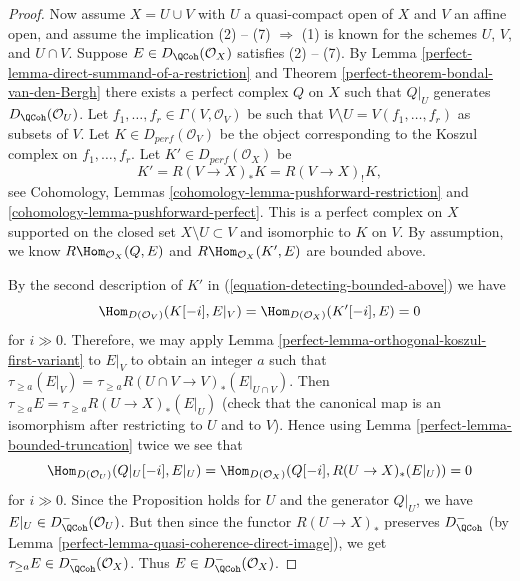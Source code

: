 \begin{proof}
\medskip\noindent
Now assume $X = U \cup V$ with $U$ a quasi-compact open of $X$ and
$V$ an affine open, and assume the implication (2) -- (7) $\Rightarrow$ (1)
is known for the schemes $U$, $V$, and $U \cap V$.
Suppose $E \in D_\QCoh(\mathcal{O}_X)$ satisfies (2) -- (7).
By Lemma \ref{perfect-lemma-direct-summand-of-a-restriction} and
Theorem \ref{perfect-theorem-bondal-van-den-Bergh} there exists a perfect
complex $Q$ on $X$ such that $Q|_U$ generates $D_\QCoh (\mathcal{O}_U)$.
Let $f_1, \dots , f_r \in \Gamma (V, \mathcal{O}_V)$
be such that $V \setminus U = V(f_1, \dots , f_r)$ as subsets of
$V$. Let $K \in D_{perf}(\mathcal{O}_V)$ be the object
corresponding to the Koszul complex on $f_1, \dots , f_r$.
Let $K' \in D_{perf}(\mathcal{O}_X)$ be
\begin{equation}
\label{equation-detecting-bounded-above}
K' = R (V \to X)_* K = R (V \to X)_! K,
\end{equation}
see Cohomology, Lemmas \ref{cohomology-lemma-pushforward-restriction} and
\ref{cohomology-lemma-pushforward-perfect}. This is a perfect
complex on $X$ supported on the closed set $X \setminus U \subset V$
and isomorphic to $K$ on $V$. By assumption, we know
$R\Hom_{\mathcal{O}_X}(Q, E)$ and
$R\Hom_{\mathcal{O}_X}(K', E)$ are bounded above.

\medskip\noindent
By the second description of $K'$ in (\ref{equation-detecting-bounded-above})
we have
$$
\Hom_{D(\mathcal{O}_V)}(K[-i], E|_V) = \Hom_{D(\mathcal{O}_X)}(K'[-i], E) = 0
$$
for $i \gg 0$. Therefore, we may apply
Lemma \ref{perfect-lemma-orthogonal-koszul-first-variant} to $E|_V$ to
obtain an integer $a$ such that
$\tau_{\geq a}(E|_V) = \tau_{\geq a} R (U \cap V \to V)_* (E|_{U \cap V})$.
Then $\tau_{\geq a} E = \tau_{\geq a} R (U \to X)_* (E |_U)$
(check that the canonical map is an isomorphism after restricting to
$U$ and to $V$). Hence using Lemma \ref{perfect-lemma-bounded-truncation}
twice we see that
$$
\Hom_{D(\mathcal{O}_U)}(Q|_U [-i], E|_U) =
\Hom_{D(\mathcal{O}_X)}(Q[-i], R (U \to X)_* (E|_U)) = 0
$$
for $i \gg 0$. Since the Proposition holds for $U$ and the generator
$Q|_U$, we have $E|_U \in D^-_\QCoh(\mathcal{O}_U)$. But then since
the functor $R (U \to X)_*$ preserves $D^-_\QCoh$
(by Lemma \ref{perfect-lemma-quasi-coherence-direct-image}), we get
$\tau_{\geq a}E \in D^-_\QCoh(\mathcal{O}_X)$. Thus
$E \in D^-_\QCoh (\mathcal{O}_X)$.
\end{proof}


